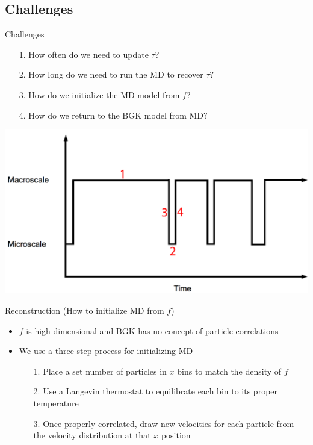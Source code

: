 \documentclass{beamer}
\begin{document}
	\subsection{Challenges}
	\begin{frame}{Challenges}
		\begin{itemize}
			\item[1. ]  How often do we need to update $\tau$?
			\item[2. ]  How long do we need to run the MD to recover $\tau$?
			\item[3. ]  How do we initialize the MD model from $f$?
			\item[4. ]  How do we return to the BGK model from MD?
		\end{itemize}
		\begin{center}
			\includegraphics[height=0.55\textheight]{scheme2.png}
		\end{center}
	\end{frame}
	
	\begin{frame}{Reconstruction (How to initialize MD from $f$)}
		\begin{itemize}
		\item $f$ is high dimensional and BGK has no concept of particle correlations
		\vspace{0.5em}
		\item We use a three-step process for initializing MD
		\vspace{0.5em}
		\begin{itemize}
		\item[1. ] Place a set number of particles in $x$ bins to match the density of $f$
		\vspace{0.5em}
		\item[2. ] Use a Langevin thermostat to equilibrate each bin to its proper temperature
		\vspace{0.5em}
		\item[3. ] Once properly correlated, draw new velocities for each particle from the velocity distribution at that $x$ position
		\end{itemize}
		\end{itemize}
	\end{frame}
	
\end{document}
